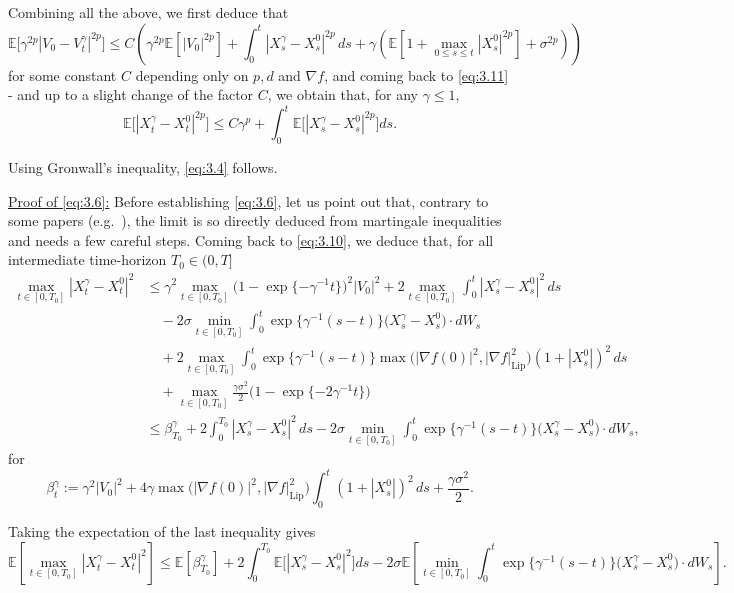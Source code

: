 \documentclass[11pt]{article}
\theoremstyle{remark}
\begin{document}
Combining all the above, we first deduce that
\[
\mathbb{E}\bigl[\gamma^{2p}|V_0-V_t^{\gamma}|^{2p}\bigr]\le C\left(\gamma^{2p}\mathbb{E}[|V_0|^{2p}]+\int_0^t |X_s^{\gamma}-X_s^0|^{2p}\,ds+\gamma\left(\mathbb{E}\left[1+\max_{0\le s\le t}|X_s^0|^{2p}\right]+\sigma^{2p}\right)\right)
\]
for some constant $C$ depending only on $p,d$ and $\nabla f$, and coming back to \eqref{eq:3.11} - and up to a slight change of the factor $C$, we obtain that, for any $\gamma\le 1$,
\begin{equation}
\label{eq:3.12}
\mathbb{E}\bigl[|X_t^{\gamma}-X_t^0|^{2p}\bigr]\le C\gamma^p+\int_0^t \mathbb{E}\bigl[|X_s^{\gamma}-X_s^0|^{2p}\bigr]ds.
\end{equation}

Using Gronwall's inequality, \eqref{eq:3.4} follows.

\underline{Proof of \eqref{eq:3.6}:}
Before establishing \eqref{eq:3.6}, let us point out that, contrary to some papers (e.g.~\cite{f04}), the limit is so directly deduced from martingale inequalities and needs a few careful steps.
Coming back to \eqref{eq:3.10}, we deduce that, for all intermediate time-horizon $T_0\in(0,T]$
\[
\begin{aligned}
\max_{t\in[0,T_0]}|X_t^{\gamma}-X_t^0|^2
&\le \gamma^2\max_{t\in[0,T_0]}\bigl(1-\exp\{-\gamma^{-1}t\}\bigr)^2|V_0|^2+2\max_{t\in[0,T_0]}\int_0^t |X_s^{\gamma}-X_s^0|^2\,ds \\
&\quad -2\sigma\min_{t\in[0,T_0]}\int_0^t \exp\{\gamma^{-1}(s-t)\}\bigl(X_s^{\gamma}-X_s^0\bigr)\cdot dW_s \\
&\quad +2\max_{t\in[0,T_0]}\int_0^t \exp\{\gamma^{-1}(s-t)\}\max\bigl(|\nabla f(0)|^2,|\nabla f|_{\mathrm{Lip}}^2\bigr)(1+|X_s^0|)^2\,ds \\
&\quad +\max_{t\in[0,T_0]}\frac{\gamma\sigma^2}{2}\bigl(1-\exp\{-2\gamma^{-1}t\}\bigr) \\
&\le \beta_{T_0}^{\gamma}+2\int_0^{T_0}|X_s^{\gamma}-X_s^0|^2\,ds-2\sigma\min_{t\in[0,T_0]}\int_0^t \exp\{\gamma^{-1}(s-t)\}\bigl(X_s^{\gamma}-X_s^0\bigr)\cdot dW_s,
\end{aligned}
\]
for
\[
\beta_t^{\gamma}:=\gamma^2|V_0|^2+4\gamma\max\bigl(|\nabla f(0)|^2,|\nabla f|_{\mathrm{Lip}}^2\bigr)\int_0^t (1+|X_s^0|)^2\,ds+\frac{\gamma\sigma^2}{2}.
\]

Taking the expectation of the last inequality gives
\[
\mathbb{E}\left[\max_{t\in[0,T_0]}|X_t^{\gamma}-X_t^0|^2\right]\le \mathbb{E}[\beta_{T_0}^{\gamma}]+2\int_0^{T_0}\mathbb{E}\bigl[|X_s^{\gamma}-X_s^0|^2\bigr]ds-2\sigma\mathbb{E}\left[\min_{t\in[0,T_0]}\int_0^t \exp\{\gamma^{-1}(s-t)\}\bigl(X_s^{\gamma}-X_s^0\bigr)\cdot dW_s\right].
\]
\end{document}
